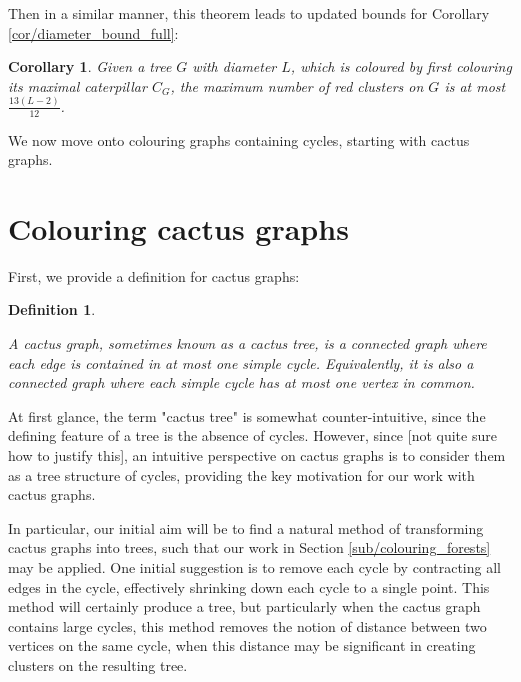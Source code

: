 \documentclass{mpaper}
\newtheorem{definition}{Definition}[section]
\newtheorem{corollary}{Corollary}[section]
\begin{document}
  Then in a similar manner, this theorem leads to updated bounds for Corollary \ref{cor/diameter_bound_full}:

\begin{corollary}
\label{cor/diameter_bound_full_2}
Given a tree $G$ with diameter $L$, which is coloured by first colouring its maximal caterpillar $C_G$, the maximum number of red clusters on $G$ is at most $\frac{13(L-2)}{12}$.

\end{corollary}

We now move onto colouring graphs containing cycles, starting with cactus graphs.

\section{Colouring cactus graphs}
\label{sec/cactus_colouring}

First, we provide a definition for cactus graphs:

\begin{definition}
  \label{def/cactus_graphs}

  A \emph{cactus graph}, sometimes known as a cactus tree, is a connected graph where each edge is contained in at most one simple cycle. Equivalently, it is also a connected graph where each simple cycle has at most one vertex in common. 
\end{definition}

At first glance, the term "cactus tree" is somewhat counter-intuitive, since the defining feature of a tree is the absence of cycles. However, since [not quite sure how to justify this], an intuitive perspective on cactus graphs is to consider them as a tree structure of cycles, providing the key motivation for our work with cactus graphs.

In particular, our initial aim will be to find a natural method of transforming cactus graphs into trees, such that our work in Section \ref{sub/colouring_forests} may be applied. One initial suggestion is to remove each cycle by contracting all edges in the cycle, effectively shrinking down each cycle to a single point. This method will certainly produce a tree, but particularly when the cactus graph contains large cycles, this method removes the notion of distance between two vertices on the same cycle, when this distance may be significant in creating clusters on the resulting tree.
\end{document}
